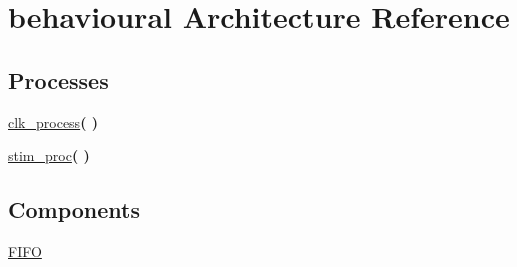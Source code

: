 \hypertarget{classtestbenchFifo_1_1behavioural}{}\section{behavioural Architecture Reference}
\label{classtestbenchFifo_1_1behavioural}
\subsection*{Processes}
 \begin{DoxyCompactItemize}
\item 
\mbox{\label{classtestbenchFifo_1_1behavioural_ac5bb218131b813f7908ec89476b31fca}} 
\hyperlink{classtestbenchFifo_1_1behavioural_ac5bb218131b813f7908ec89476b31fca}{clk\+\_\+process}{\bfseries  (  )}
\item 
\mbox{\label{classtestbenchFifo_1_1behavioural_ad2efa6785cff833c341e27596b21aeb5}} 
\hyperlink{classtestbenchFifo_1_1behavioural_ad2efa6785cff833c341e27596b21aeb5}{stim\+\_\+proc}{\bfseries  (  )}
\end{DoxyCompactItemize}
\subsection*{Components}
 \begin{DoxyCompactItemize}
\item 
\mbox{\label{classtestbenchFifo_1_1behavioural_a2055ffc86a781cfd9d1470f72494f04a}} 
\hyperlink{classtestbenchFifo_1_1behavioural_a2055ffc86a781cfd9d1470f72494f04a}{F\+I\+FO}  {\bfseries }  
\end{DoxyCompactItemize}
